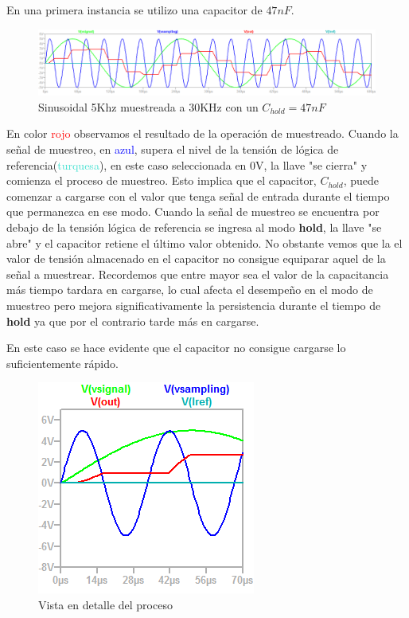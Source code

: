 En una primera instancia se utilizo una capacitor de $47nF$. 
\begin{figure}[H]
	\centering
	\includegraphics[width=\linewidth]{ImagenesEjercicio4/ChTests/Vin1_30ksamplig47nF}
	\caption{Sinusoidal 5Khz muestreada a 30KHz con un $C_{hold}=47nF$}
	\label{fig:vin130ksamplig47nf}
\end{figure}
En color \textcolor{red}{rojo} observamos el resultado de la operación de muestreado. 
Cuando la señal de muestreo, en \textcolor{blue}{azul}, supera el nivel de la tensión de lógica de referencia(\textcolor{turquoise}{turquesa}), en este caso seleccionada en 0V, la llave "se cierra" y comienza el proceso de muestreo. Esto implica que el capacitor, $C_{hold}$, puede comenzar a cargarse con el valor que tenga señal de entrada durante el tiempo que permanezca en ese modo. Cuando la señal de muestreo se encuentra por debajo de la tensión lógica de referencia se ingresa al modo \textbf{hold}, la llave "se abre" y el capacitor retiene el último valor obtenido. No obstante vemos que la el valor de tensión almacenado en el capacitor no consigue equiparar aquel de la señal a muestrear. Recordemos que entre mayor sea el valor de la capacitancia más tiempo tardara en cargarse, lo cual afecta el desempeño en el modo de muestreo pero mejora significativamente la persistencia durante el tiempo de \textbf{hold} ya que por el contrario tarde más en cargarse.

En este caso se hace evidente que el capacitor no consigue cargarse lo suficientemente rápido.

\begin{figure}[H]
	\centering
	\includegraphics[]{ImagenesEjercicio4/ChTests/Vin1_30ksamplig47nFZoom}
	\caption{Vista en detalle del proceso}
	\label{fig:vin130ksamplig47nfzoom}
\end{figure}


